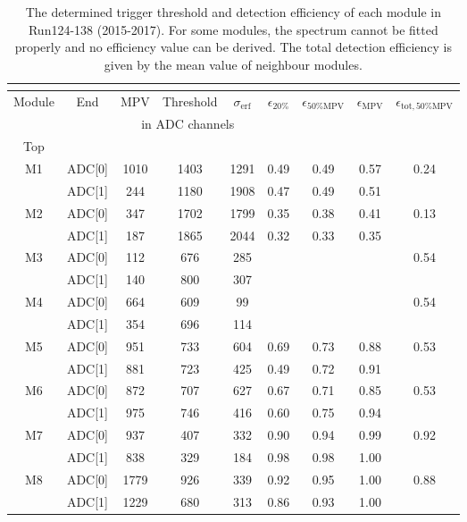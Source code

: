 \small
\begin{longtable}{c c c c c c c c c}
  \caption{The determined trigger threshold and detection efficiency of each module in Run124-138 (2015-2017). For some modules, the spectrum cannot be fitted properly and no efficiency value can be derived. The total detection efficiency is given by the mean value of neighbour modules.} \\
  \label{tab:mpv-full}\\
  \toprule
  Module & End & MPV & Threshold & $\sigma{}_{\mathrm{erf}}$ & $\epsilon_{20\%}$ & $\epsilon_{50\%\mathrm{MPV}}$ & $\epsilon_{\mathrm{MPV}}$ & $\epsilon_{\mathrm{tot}, 50\%\mathrm{MPV}}$ \\
         &     & \multicolumn{3}{|c|}{in ADC channels} &   \\
  \midrule
  \endfirsthead
  Top\\
  \midrule
  M1 & ADC[0] & 1010 & 1403 & 1291 & 0.49 & 0.49 & 0.57 & \multirow{2}{*}{0.24}\\
     & ADC[1] & 244 & 1180 & 1908 & 0.47 & 0.49 & 0.51 & \\
  M2 & ADC[0] & 347 & 1702 & 1799 & 0.35 & 0.38 & 0.41 & \multirow{2}{*}{0.13}\\
     & ADC[1] & 187 & 1865 & 2044 & 0.32 & 0.33 & 0.35 &\\
  M3 & ADC[0] & 112 & 676 & 285 &  &  &  & \multirow{2}{*}{0.54}\\
     & ADC[1] & 140 & 800 & 307 &  &  &  & \\
  M4 & ADC[0] & 664 & 609 & 99  &  &  & & \multirow{2}{*}{0.54}\\
     & ADC[1] & 354 & 696 & 114 &  &  & & \\
  M5 & ADC[0] & 951 & 733 & 604 & 0.69 & 0.73 & 0.88 & \multirow{2}{*}{0.53}\\
     & ADC[1] & 881 & 723 & 425 & 0.49 & 0.72 & 0.91 &\\
  M6 & ADC[0] & 872 & 707 & 627 & 0.67 & 0.71 & 0.85 & \multirow{2}{*}{0.53}\\
     & ADC[1] & 975 & 746 & 416 & 0.60 & 0.75 & 0.94 &\\
  M7 & ADC[0] & 937 & 407 & 332 & 0.90 & 0.94 & 0.99 & \multirow{2}{*}{0.92}\\
     & ADC[1] & 838 & 329 & 184 & 0.98 & 0.98 & 1.00 & \\
  M8 & ADC[0] & 1779 & 926 & 339 & 0.92 & 0.95 & 1.00 & \multirow{2}{*}{0.88}\\
     & ADC[1] & 1229 & 680 & 313 & 0.86 & 0.93 & 1.00 &\\

\end{longtable}
